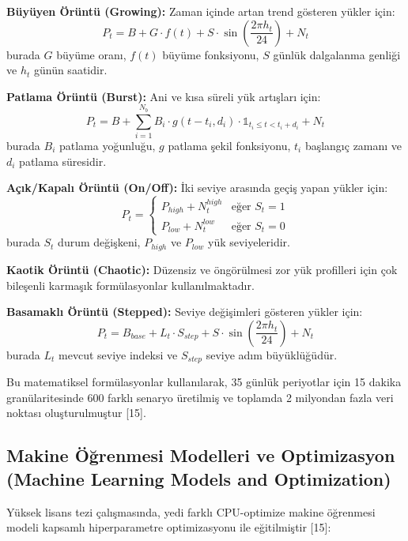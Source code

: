 \documentclass[12pt,a4paper]{article}
\begin{document}
\textbf{Büyüyen Örüntü (Growing):} Zaman içinde artan trend gösteren yükler için:
\begin{equation}
P_t = B + G \cdot f(t) + S \cdot \sin\left(\frac{2\pi h_t}{24}\right) + N_t
\end{equation}
burada $G$ büyüme oranı, $f(t)$ büyüme fonksiyonu, $S$ günlük dalgalanma genliği ve $h_t$ günün saatidir.

\textbf{Patlama Örüntü (Burst):} Ani ve kısa süreli yük artışları için:
\begin{equation}
P_t = B + \sum_{i=1}^{N_b} B_i \cdot g(t-t_i, d_i) \cdot \mathbb{1}_{t_i \leq t < t_i+d_i} + N_t
\end{equation}
burada $B_i$ patlama yoğunluğu, $g$ patlama şekil fonksiyonu, $t_i$ başlangıç zamanı ve $d_i$ patlama süresidir.

\textbf{Açık/Kapalı Örüntü (On/Off):} İki seviye arasında geçiş yapan yükler için:
\begin{equation}
P_t = \begin{cases}
P_{high} + N_t^{high} & \text{eğer } S_t = 1 \\
P_{low} + N_t^{low} & \text{eğer } S_t = 0
\end{cases}
\end{equation}
burada $S_t$ durum değişkeni, $P_{high}$ ve $P_{low}$ yük seviyeleridir.

\textbf{Kaotik Örüntü (Chaotic):} Düzensiz ve öngörülmesi zor yük profilleri için çok bileşenli karmaşık formülasyonlar kullanılmaktadır.

\textbf{Basamaklı Örüntü (Stepped):} Seviye değişimleri gösteren yükler için:
\begin{equation}
P_t = B_{base} + L_t \cdot S_{step} + S \cdot \sin\left(\frac{2\pi h_t}{24}\right) + N_t
\end{equation}
burada $L_t$ mevcut seviye indeksi ve $S_{step}$ seviye adım büyüklüğüdür.

Bu matematiksel formülasyonlar kullanılarak, 35 günlük periyotlar için 15 dakika granülaritesinde 600 farklı senaryo üretilmiş ve toplamda 2 milyondan fazla veri noktası oluşturulmuştur [15].

\subsection{Makine Öğrenmesi Modelleri ve Optimizasyon (Machine Learning Models and Optimization)}

Yüksek lisans tezi çalışmasında, yedi farklı CPU-optimize makine öğrenmesi modeli kapsamlı hiperparametre optimizasyonu ile eğitilmiştir [15]:
\end{document}
